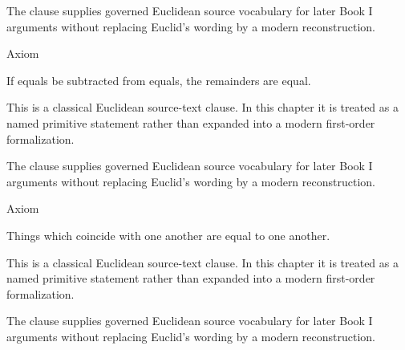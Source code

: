 \begin{remark*}[Interpretation]
The clause supplies governed Euclidean source vocabulary for later Book I
arguments without replacing Euclid's wording by a modern reconstruction.
\end{remark*}

\begin{lra-not-visible}
\NoLocalDependencies
\end{lra-not-visible}

\begin{axiombox}{Axiom}
\begin{axiom}
\label{ax:euclid-common-notion-subtract-equals}
If equals be subtracted from equals, the remainders are equal.
\end{axiom}
\end{axiombox}
\begin{remark*}
This is a classical Euclidean source-text clause. In this chapter it is treated
as a named primitive statement rather than expanded into a modern first-order
formalization.
\end{remark*}

\begin{remark*}[Interpretation]
The clause supplies governed Euclidean source vocabulary for later Book I
arguments without replacing Euclid's wording by a modern reconstruction.
\end{remark*}

\begin{lra-not-visible}
\NoLocalDependencies
\end{lra-not-visible}

\begin{axiombox}{Axiom}
\begin{axiom}
\label{ax:euclid-common-notion-coinciding-things-equal}
Things which coincide with one another are equal to one another.
\end{axiom}
\end{axiombox}
\begin{remark*}
This is a classical Euclidean source-text clause. In this chapter it is treated
as a named primitive statement rather than expanded into a modern first-order
formalization.
\end{remark*}

\begin{remark*}[Interpretation]
The clause supplies governed Euclidean source vocabulary for later Book I
arguments without replacing Euclid's wording by a modern reconstruction.
\end{remark*}

